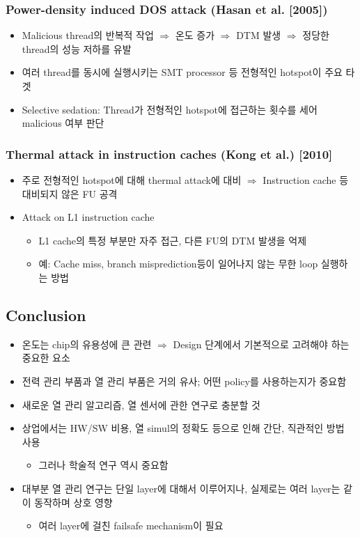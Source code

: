 \subsubsection*{Power-density induced DOS attack (Hasan et al. [2005])}
\begin{itemize}
    \item Malicious thread의 반복적 작업 $\Rightarrow$ 온도 증가 $\Rightarrow$ DTM 발생 $\Rightarrow$ 정당한 thread의 성능 저하를 유발
    \item 여러 thread를 동시에 실행시키는 SMT processor 등 전형적인 hotspot이 주요 타겟
    \item Selective sedation: Thread가 전형적인 hotspot에 접근하는 횟수를 세어 malicious 여부 판단
\end{itemize}

\subsubsection*{Thermal attack in instruction caches (Kong et al.) [2010]}
\begin{itemize}
    \item 주로 전형적인 hotspot에 대해 thermal attack에 대비 $\Rightarrow$ Instruction cache 등 대비되지 않은 FU 공격
    \item Attack on L1 instruction cache
    \begin{itemize}
        \item L1 cache의 특정 부분만 자주 접근, 다른 FU의 DTM 발생을 억제
        \item 예: Cache miss, branch misprediction등이 일어나지 않는 무한 loop 실행하는 방법
    \end{itemize}
\end{itemize}

\subsection{Conclusion}
\begin{itemize}
    \item 온도는 chip의 유용성에 큰 관련 $\Rightarrow$ Design 단계에서 기본적으로 고려해야 하는 중요한 요소
    \item 전력 관리 부품과 열 관리 부품은 거의 유사; 어떤 policy를 사용하는지가 중요함
    \item 새로운 열 관리 알고리즘, 열 센서에 관한 연구로 충분할 것
    \item 상업에서는 HW/SW 비용, 열 simul의 정확도 등으로 인해 간단, 직관적인 방법 사용
    \begin{itemize}
        \item 그러나 학술적 연구 역시 중요함
    \end{itemize}
    \item 대부분 열 관리 연구는 단일 layer에 대해서 이루어지나, 실제로는 여러 layer는 같이 동작하며 상호 영향
    \begin{itemize}
        \item 여러 layer에 걸친 failsafe mechanism이 필요
    \end{itemize}
\end{itemize}
